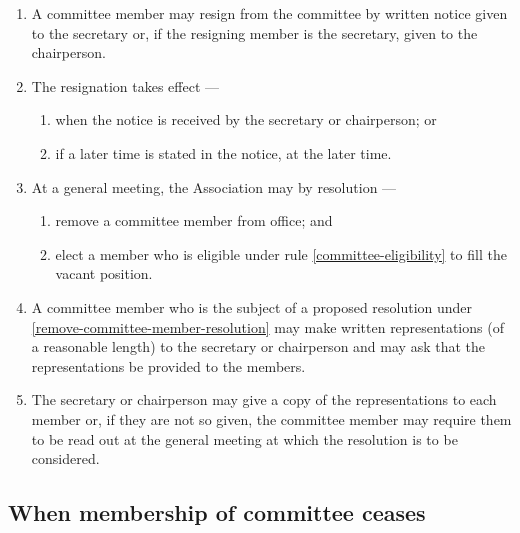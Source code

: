 \documentclass[../constitution.tex]{subfiles}
\begin{document}
\begin{enumerate}

\item A committee member may resign from the committee by written notice given to the secretary or, if the resigning member is the secretary, given to the chairperson.
\item The resignation takes effect ---

  \begin{enumerate}
  
  \item when the notice is received by the secretary or chairperson; or
  \item if a later time is stated in the notice, at the later time.
  \end{enumerate}
\item At a general meeting, the Association may by resolution --- 

  \begin{enumerate}
  
  \item remove a committee member from office; and \label{remove-committee-member-resolution}
  \item elect a member who is eligible under rule \ref{committee-eligibility} to fill the vacant position. \label{elect-committee-at-general-meeting}
  \end{enumerate}
\item A committee member who is the subject of a proposed resolution under  \ref{remove-committee-member-resolution} may make written representations (of a reasonable length) to the secretary or chairperson and may ask that the representations be provided to the members.
\item The secretary or chairperson may give a copy of the representations to each member or, if they are not so given, the committee member may require them to be read out at the general meeting at which the resolution is to be considered.
\end{enumerate}

\hypertarget{when-membership-of-committee-ceases}{%
\subsection{When membership of committee ceases}\label{when-membership-of-committee-ceases}}
\end{document}
